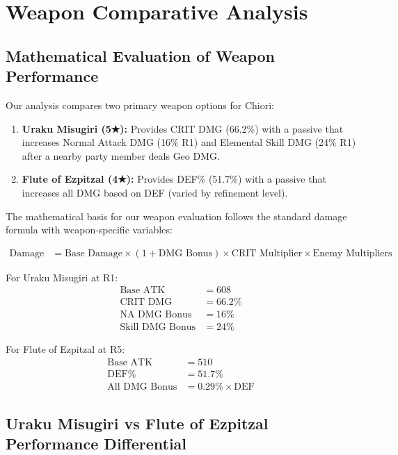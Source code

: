 \documentclass[12pt,a4paper]{article}
\begin{document}
\section{Weapon Comparative Analysis}

\subsection{Mathematical Evaluation of Weapon Performance}

Our analysis compares two primary weapon options for Chiori:

\begin{enumerate}
    \item \textbf{Uraku Misugiri (5★):} Provides CRIT DMG (66.2\%) with a passive that increases Normal Attack DMG (16\% R1) and Elemental Skill DMG (24\% R1) after a nearby party member deals Geo DMG.
    \item \textbf{Flute of Ezpitzal (4★):} Provides DEF\% (51.7\%) with a passive that increases all DMG based on DEF (varied by refinement level).
\end{enumerate}

The mathematical basis for our weapon evaluation follows the standard damage formula with weapon-specific variables:

\begin{align}
\text{Damage} &= \text{Base Damage} \times (1 + \text{DMG Bonus}) \times \text{CRIT Multiplier} \times \text{Enemy Multipliers}
\end{align}

For Uraku Misugiri at R1:
\begin{align}
\text{Base ATK} &= 608 \\
\text{CRIT DMG} &= 66.2\% \\
\text{NA DMG Bonus} &= 16\% \\
\text{Skill DMG Bonus} &= 24\%
\end{align}

For Flute of Ezpitzal at R5:
\begin{align}
\text{Base ATK} &= 510 \\
\text{DEF\%} &= 51.7\% \\
\text{All DMG Bonus} &= 0.29\% \times \text{DEF}
\end{align}

\subsection{Uraku Misugiri vs Flute of Ezpitzal Performance Differential}
\end{document}

